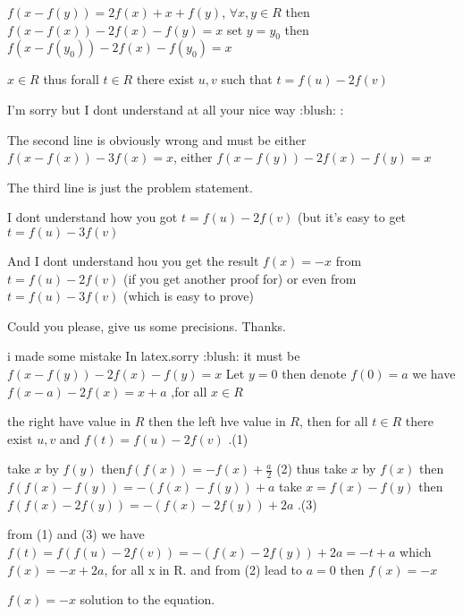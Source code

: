 \begin{solution}
	\begin{tcolorbox}$ f(x - f(y)) = 2f(x) + x + f(y)$, $ \forall x,y \in R$
then $ f(x - f(x)) - 2f(x) - f(y) = x$
set $ y = y_0$ then  $ f(x - f(y_0)) - 2f(x) - f(y_0) = x$

$ x \in R$ thus forall $ t\in R$ there exist $ u,v$ such that $ t = f(u) - 2f(v)$\end{tcolorbox}
I'm sorry but I dont understand at all your nice way  :blush:  :

The second line is obviously wrong and must be either  $ f(x - f(x)) - 3f(x) = x$, either  $ f(x - f(y)) - 2f(x) - f(y) = x$

The third line is just the problem statement.

I dont understand how you got $ t = f(u) - 2f(v)$ (but it's easy to get $ t = f(u) - 3f(v)$

And I dont understand hou you get the result $ f(x)=-x$ from $ t = f(u) - 2f(v)$ (if you get another proof for) or even from $ t = f(u) - 3f(v)$ (which is easy to prove)

Could you please, give us some precisions.
Thanks.
\end{solution}



\begin{solution}
	i made some mistake In latex.sorry :blush: 
it must be $ f(x - f(y)) - 2f(x) - f(y) = x$
Let $ y = 0$ then denote $ f(0) = a$ we have $ f(x - a) - 2f(x) = x + a$ ,for all $ x\in R$

the right have value in $ R$ then the left hve value in $ R$, then for all $ t \in R$ there exist $ u,v$ and $ f(t) = f(u) - 2f(v)$                                              .(1)

take $ x$ by $ f(y)$ then$ f(f(x)) = - f(x) + \frac {a}{2}$   (2)
thus take $ x$ by $ f(x)$ then $ f(f(x) - f(y)) = - (f(x) - f(y)) + a$
take $ x = f(x) - f(y)$ then $ f(f(x) - 2f(y)) = - (f(x) - 2f(y)) + 2a$    .(3)

from (1) and (3) we have $ f(t) = f(f(u) - 2f(v)) = - (f(x) - 2f(y)) + 2a = - t + a$
which $ f(x) = - x + 2a$, for all x in R. and from (2) lead to $ a = 0$ then $ f(x) = - x$

$ f(x) = - x$ solution to the equation.
\end{solution}



